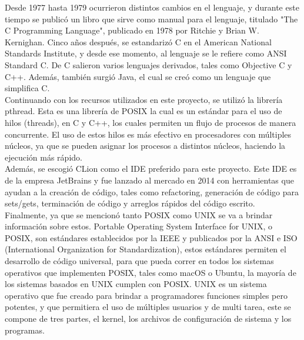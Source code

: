 \documentclass[12pt, article, natbib]{IEEEtran}
\begin{document}
Desde 1977 hasta 1979 ocurrieron distintos cambios en el lenguaje, y durante este tiempo se publicó un libro que sirve como manual para el lenguaje, titulado "The C Programming Language", publicado en 1978 por Ritchie y Brian W. Kernighan. Cinco años después, se estandarizó C en el American National Standards Institute, y desde ese momento, al lenguaje se le refiere como ANSI Standard C. De C salieron varios lenguajes derivados, tales como Objective C y C++. Además, también surgió Java, el cual se creó como un lenguaje que simplifica C.\cite{mritchie_1993_the}\\

Continuando con los recursos utilizados en este proyecto, se utilizó la librería pthread. Esta es una librería de POSIX la cual es un estándar para el uso de hilos (threads), en C y C++, los cuales permiten un flujo de procesos de manera concurrente. El uso de estos hilos es más efectivo en procesadores con múltiples núcleos, ya que se pueden asignar los procesos a distintos núcleos, haciendo la ejecución más rápido.\cite{ippolito_2020_linux}\\

Además, se escogió CLion como el IDE preferido para este proyecto. Este IDE es de la empresa JetBrains y fue lanzado al mercado en 2014\cite{avram_2014_jetbrains} con herramientas que ayudan a la creación de código, tales como refactoring, generación de código para sets/gets, terminación de código y arreglos rápidos del código escrito.\cite{jetbrains_intelligent}\\

Finalmente, ya que se mencionó tanto POSIX como UNIX se va a brindar información sobre estos. Portable Operating System Interface for UNIX, o POSIX, son estándares establecidos por la IEEE y publicados por la ANSI e ISO (International Organization for Standardization), estos estándares permiten el desarrollo de código universal, para que pueda correr en todos los sistemas operativos que implementen POSIX, tales como macOS o Ubuntu, la mayoría de los sistemas basados en UNIX cumplen con POSIX.\cite{universityinformationtechnologyservices_2021_about} UNIX es un sistema operativo que fue creado para brindar a programadores funciones simples pero potentes, y que permitiera el uso de múltiples usuarios y de multi tarea, este se compone de tres partes, el kernel, los archivos de configuración de sistema y los programas.\cite{idahostateuniversity_1997_what}
\end{document}
